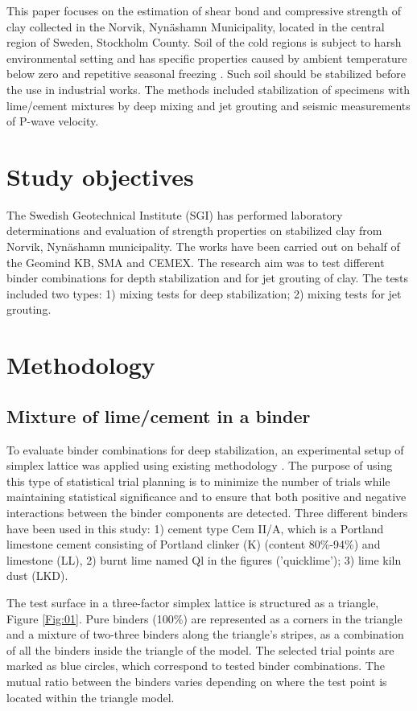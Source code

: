\documentclass[USenglish,twocolumn]{article}
\begin{document}
This paper focuses on the estimation of shear bond and compressive strength of clay collected in the Norvik, Nynäshamn Municipality, located in the central region of Sweden, Stockholm County. Soil of the cold regions is subject to harsh environmental setting and has specific properties caused by ambient temperature below zero and repetitive seasonal freezing \cite{LindhWinter,Lemenkov2021b,Lemenkov2021a,Sato}. Such soil should be stabilized before the use in industrial works. The methods included stabilization of specimens with lime/cement mixtures by deep mixing and jet grouting and seismic measurements of P-wave velocity. 

\newpage
\section{Study objectives}
The Swedish Geotechnical Institute (SGI) has performed laboratory determinations and evaluation of strength properties on stabilized clay from Norvik, Nynäshamn municipality. The works have been carried out on behalf of the Geomind KB, SMA and CEMEX. The research aim was to test different binder combinations for depth stabilization and for jet grouting of clay. The tests included two types: 1) mixing tests for deep stabilization; 2) mixing tests for jet grouting. 

\section{Methodology}

\subsection{Mixture of lime/cement in a binder}
To evaluate binder combinations for deep stabilization, an experimental setup of simplex lattice was applied using existing methodology \citep{Montgomery2019,Myres}. The purpose of using this type of statistical trial planning is to minimize the number of trials while maintaining statistical significance and to ensure that both positive and negative interactions between the binder components are detected. Three different binders have been used in this study: 1) cement type Cem II/A, which is a Portland limestone cement consisting of Portland clinker (K) (content 80\%-94\%) and limestone (LL), 2) burnt lime named Ql in the figures ('quicklime'); 3) lime kiln dust (LKD). 

The test surface in a three-factor simplex lattice is structured as a triangle, Figure \ref{Fig:01}. Pure binders (100\%) are represented as a corners in the triangle and a mixture of two-three binders along the triangle's stripes, as a combination of all the binders inside the triangle of the model. The selected trial points are marked as blue circles, which correspond to tested binder combinations. The mutual ratio between the binders varies depending on where the test point is located within the triangle model. 
\end{document}

